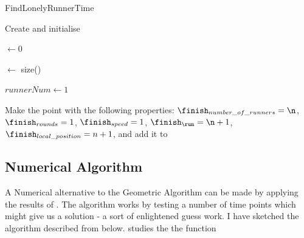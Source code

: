 \begin{algorithm}[H]
  \caption{FindLonelyRunnerTime}
  \highlights

  Create and initialise \li
  
  \inter $\gets 0$
  
  \n $\gets$ size(\s)
  
  $runnerNum \gets 1$
  
  Make the point \finish with the following properties: $\finish_{number\_of\_runners} = \n$, $\finish_{rounds} = 1$, $\finish_{speed} = 1$, $\finish_{\run} = \n + 1$, $\finish_{local\_position} = n + 1$, and add it to \li

  
\end{algorithm}

\subsection{Numerical Algorithm}
\label{numtheory:algo}
A Numerical alternative to the Geometric Algorithm can be made by applying the results of \cite{invis}. The algorithm works by testing a number of time points which might give us a solution - a sort of enlightened guess work. I have sketched the algorithm described from \cite{invis} below. \cite{invis} studies the the function 

